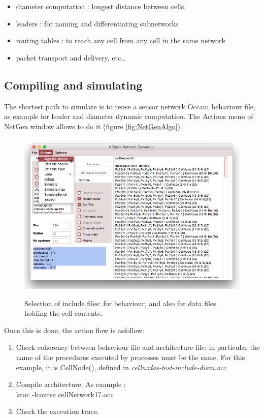 \begin{itemize}
\item diameter computation : longest distance between cells,
\item leaders : for naming and differentiating subnetworks
\item routing tables : to reach any cell from any cell in the same network
\item packet transport and delivery, etc\ldots
\end{itemize}

\subsection {Compiling and simulating }

The shortest path to simulate is to reuse a sensor network Occam behaviour file,
as example for leader and diameter dynamic computation. The Actions menu
of NetGen window allows to do it (figure \ref{fig:NetGenAlgo}).

\begin{figure}[hbtp]
\begin{center} 
\includegraphics[width=12cm]{NetGenAlgoFile.png}
\caption{Selection of include files: for  behaviour, and also for data files holding the cell contents.}
\label{fig:NetGenAlgo}
\label{fig:includeFiles}
\end{center}
\end{figure}

Once this is done, the action flow is asfollow:
\begin{enumerate}
\item Check coherency between behaviour file and architecture file: in particular the name of the
procedures executed by processes must be the same. For this example, it is CellNode(),
defined in {\sl cellnodes-test-include-diam.occ}.
\item Compile architecture. As example :\\
kroc -lcourse cellNetwork17.occ
\item Check the execution trace.
\end{enumerate}


